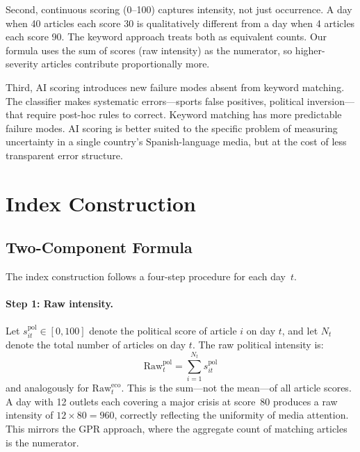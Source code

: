 \documentclass[12pt,a4paper]{article}
\begin{document}
Second, continuous scoring (0--100) captures intensity, not just
occurrence.  A day when 40 articles each score 30 is qualitatively
different from a day when 4 articles each score 90.  The keyword approach
treats both as equivalent counts.  Our formula uses the sum of scores
(raw intensity) as the numerator, so higher-severity articles contribute
proportionally more.

Third, AI scoring introduces new failure modes absent from keyword
matching.  The classifier makes systematic errors---sports false positives,
political inversion---that require post-hoc rules to correct.  Keyword
matching has more predictable failure modes.  AI scoring is better suited
to the specific problem of measuring uncertainty in a single country's
Spanish-language media, but at the cost of less transparent error
structure.

\section{Index Construction}
\label{sec:construction}

\subsection{Two-Component Formula}
\label{subsec:formula}

The index construction follows a four-step procedure for each day~$t$.

\paragraph{Step 1: Raw intensity.}
Let $s_{it}^{\text{pol}} \in [0, 100]$ denote the political score of article $i$
on day $t$, and let $N_t$ denote the total number of articles on day $t$.  The
raw political intensity is:
\begin{equation}
  \text{Raw}_t^{\text{pol}} = \sum_{i=1}^{N_t} s_{it}^{\text{pol}}
  \label{eq:raw}
\end{equation}
and analogously for $\text{Raw}_t^{\text{eco}}$.  This is the sum---not the
mean---of all article scores.  A day with 12 outlets each covering a major
crisis at score~80 produces a raw intensity of $12 \times 80 = 960$,
correctly reflecting the uniformity of media attention.  This mirrors the
GPR approach, where the aggregate count of matching articles is the
numerator.
\end{document}
